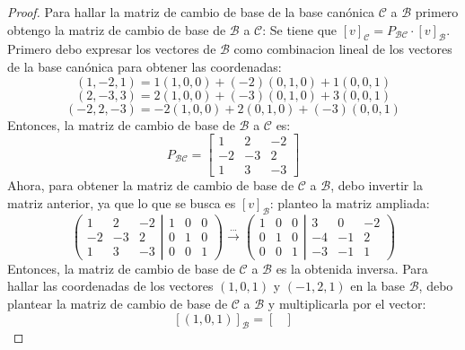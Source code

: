 \documentclass[a4,10pt]{aleph-notas}
\begin{document}
\begin{proof}
    Para hallar la matriz de cambio de base de la base canónica $\mathcal{C}$ a $\mathcal{B}$ primero obtengo la matriz de cambio de base de $\mathcal{B}$ a $\mathcal{C}$:
Se tiene que $[v]_{\mathcal{C}} = P_{\mathcal{B} \mathcal{C}} \cdot [v]_{\mathcal{B}}$. \\
Primero debo expresar los vectores de $\mathcal{B}$ como combinacion lineal de los vectores de la base canónica para obtener las coordenadas:
$$
(1,-2,1) = 1(1,0,0)+(-2)(0,1,0)+1(0,0,1)
$$
$$
(2,-3,3) = 2(1,0,0)+(-3)(0,1,0)+3(0,0,1)
$$
$$
(-2,2,-3) = -2(1,0,0)+2(0,1,0)+(-3)(0,0,1)
$$
Entonces, la matriz de cambio de base de $\mathcal{B}$ a $\mathcal{C}$ es:
$$
P_{\mathcal{B} \mathcal{C}} = \begin{bmatrix}
    1 & 2 & -2 \\
    -2 & -3 & 2 \\
    1 & 3 & -3
\end{bmatrix}
$$
Ahora, para obtener la matriz de cambio de base de $\mathcal{C}$ a $\mathcal{B}$, debo invertir la matriz anterior, ya que lo que se busca es $[v]_{\mathcal{B}}$:
planteo la matriz ampliada:
$$
\left ( \left.\begin{matrix}
    1 & 2 & -2 \\ 
    -2 & -3 & 2 \\ 
    1 & 3 & -3
    \end{matrix}\right| \begin{matrix}
    1 & 0 & 0 \\ 
    0 & 1 & 0 \\ 
    0 & 0 & 1
    \end{matrix}\right )
\xrightarrow[]{...}
\left ( \left.\begin{matrix}
    1 & 0 & 0 \\ 
    0 & 1 & 0 \\ 
    0 & 0 & 1
    \end{matrix}\right| \begin{matrix}
    3 & 0 & -2 \\ 
    -4 & -1 & 2 \\ 
    -3 & -1 & 1
    \end{matrix}\right )
$$
Entonces, la matriz de cambio de base de $\mathcal{C}$ a $\mathcal{B}$ es la obtenida inversa.
Para hallar las coordenadas de los vectores $(1,0,1)$ y $(-1,2,1)$ en la base $\mathcal{B}$, debo plantear la matriz de cambio de base de $\mathcal{C}$ a $\mathcal{B}$ y multiplicarla por el vector:
$$
[(1,0,1)]_{\mathcal{B}} = \begin{bmatrix}

\end{bmatrix}$$
\end{proof}
\end{document}
